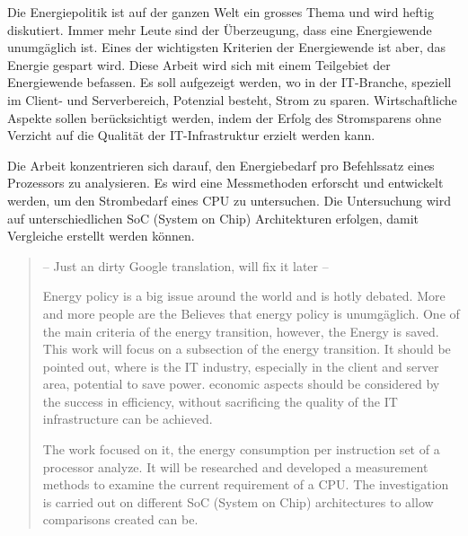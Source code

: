 \begin{zusammenfassung}

Die Energiepolitik ist auf der ganzen Welt ein grosses Thema und wird heftig diskutiert. Immer mehr Leute sind der
Überzeugung, dass eine Energiewende unumgäglich ist. Eines der wichtigsten Kriterien der Energiewende ist aber, das
Energie gespart wird. Diese Arbeit wird sich mit einem Teilgebiet der Energiewende befassen.  Es soll aufgezeigt werden,
wo in der IT-Branche, speziell im Client- und Serverbereich, Potenzial besteht, Strom zu sparen. Wirtschaftliche Aspekte
sollen berücksichtigt werden, indem der Erfolg des Stromsparens ohne Verzicht auf die Qualität der IT-Infrastruktur
erzielt werden kann.
\par
Die Arbeit konzentrieren sich darauf, den Energiebedarf pro Befehlssatz eines Prozessors zu
analysieren.  Es wird eine Messmethoden erforscht und entwickelt werden, um den Strombedarf eines CPU zu untersuchen.
Die Untersuchung wird auf unterschiedlichen SoC (System on Chip) Architekturen erfolgen, damit Vergleiche erstellt
werden können.


\end{zusammenfassung}

\begin{abstract} 

-- Just an dirty Google translation, will fix it later --

Energy policy is a big issue around the world and is hotly debated. More and more people are the
Believes that energy policy is unumgäglich. One of the main criteria of the energy transition, however, the
Energy is saved. This work will focus on a subsection of the energy transition. It should be pointed out,
where is the IT industry, especially in the client and server area, potential to save power. economic aspects
should be considered by the success in efficiency, without sacrificing the quality of the IT infrastructure
can be achieved.
\par
The work focused on it, the energy consumption per instruction set of a processor
analyze. It will be researched and developed a measurement methods to examine the current requirement of a CPU.
The investigation is carried out on different SoC (System on Chip) architectures to allow comparisons created
can be.

\end{abstract}
